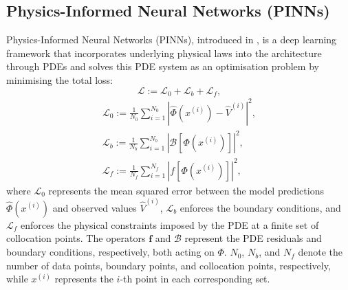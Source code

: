 \documentclass[sigconf, authorversion=true, nonacm=true]{acmart}
\begin{document}
\subsection{Physics-Informed Neural Networks (PINNs)}
Physics-Informed Neural Networks (PINNs), introduced in \cite{raissi2019physics}, is a deep learning framework that incorporates underlying physical laws into the architecture through PDEs and solves this PDE system as an optimisation problem by minimising the total loss:
\begin{equation}
    \mathcal{L} := \mathcal{L}_0 + \mathcal{L}_b + \mathcal{L}_f,
\end{equation}
\begin{equation}
\begin{gathered}
    \mathcal{L}_0 := \frac{1}{N_0} \sum_{i=1}^{N_0} \left| \widehat{\Phi}(x^{(i)}) - \widehat{V}^{(i)} \right|^2,\\
    \mathcal{L}_b := \frac{1}{N_b} \sum_{i=1}^{N_b} \left| \mathcal{B}[\Phi(x^{(i)})] \right|^2,\\
    \mathcal{L}_f := \frac{1}{N_f} \sum_{i=1}^{N_f} \left|f[\Phi(x^{(i)})] \right|^2,
\label{eq: pinns_metrics}
\end{gathered}
\end{equation}
where $\mathcal{L}_0$ represents the mean squared error between the model predictions $\widehat{\Phi}(x^{(i)})$ and observed values $\widehat{V}^{(i)}$, $\mathcal{L}_b$ enforces the boundary conditions, and $\mathcal{L}_f$ enforces the physical constraints imposed by the PDE at a finite set of collocation points. The operators $\boldsymbol{f}$ and $\boldsymbol{\mathcal{B}}$ represent the PDE residuals and boundary conditions, respectively, both acting on $\Phi$. $N_0$, $N_b$, and $N_f$ denote the number of data points, boundary points, and collocation points, respectively, while $x^{(i)}$ represents the $i$-th point in each corresponding set.
\end{document}
